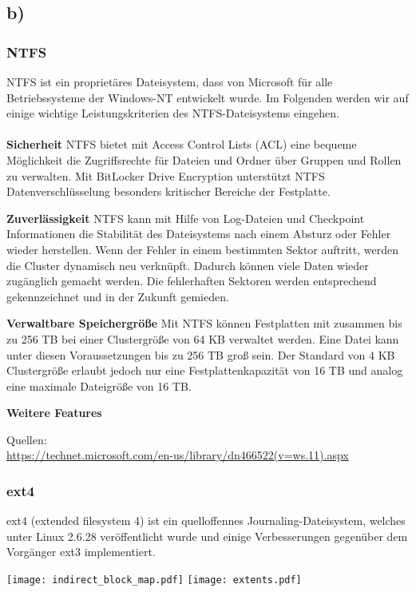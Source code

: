 \documentclass[numbers=noendperiod]{scrartcl}
\begin{document}
\subsection*{b)}
\subsubsection*{NTFS}
NTFS ist ein proprietäres Dateisystem, dass von Microsoft für alle Betriebssysteme der Windows-NT entwickelt wurde. Im Folgenden werden wir auf einige wichtige Leistungskriterien des NTFS-Dateisystems eingehen.\\ \\

\textbf{Sicherheit}
NTFS bietet mit Access Control Lists (ACL) eine bequeme Möglichkeit die Zugriffsrechte für Dateien und Ordner über Gruppen und Rollen zu verwalten. Mit BitLocker Drive Encryption unterstützt NTFS Datenverschlüsselung besonders kritischer Bereiche der Festplatte. 

\textbf{Zuverlässigkeit}
NTFS kann mit Hilfe von Log-Dateien und Checkpoint Informationen die Stabilität des Dateisystems nach einem Absturz oder Fehler wieder herstellen. Wenn der Fehler in einem bestimmten Sektor auftritt, werden die Cluster dynamisch neu verknüpft. Dadurch können viele Daten wieder zugänglich gemacht werden. Die fehlerhaften Sektoren werden entsprechend gekennzeichnet und in der Zukunft gemieden. 

\textbf{Verwaltbare Speichergröße}
Mit NTFS können Festplatten mit zusammen bis zu 256 TB bei einer Clustergröße von 64 KB verwaltet werden. Eine Datei kann unter diesen Voraussetzungen bis zu 256 TB groß sein. Der Standard von 4 KB Clustergröße erlaubt jedoch nur eine Festplattenkapazität von 16 TB und analog eine maximale Dateigröße von 16 TB. 

\textbf{Weitere Features}

Quellen:\\
\url{https://technet.microsoft.com/en-us/library/dn466522(v=ws.11).aspx}

\subsubsection*{ext4}

ext4 (extended filesystem 4) ist ein quelloffennes Journaling-Dateisystem, welches unter Linux 2.6.28 veröffentlicht wurde und einige Verbesserungen gegenüber dem Vorgänger ext3 implementiert.

\begin{minipage}{\textwidth}
	\texttt{[image: indirect\_block\_map.pdf]} \texttt{[image: extents.pdf]}
\end{minipage}
\end{document}
